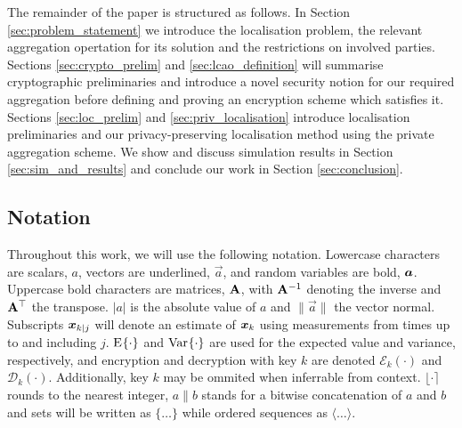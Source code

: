 \documentclass[10pt,journal,compsoc]{IEEEtran}
\theoremstyle{definition}
\theoremstyle{definition}
\theoremstyle{remark}
\begin{document}
The remainder of the paper is structured as follows. In Section \ref{sec:problem_statement} we introduce the localisation problem, the relevant aggregation opertation for its solution and the restrictions on involved parties. Sections \ref{sec:crypto_prelim} and \ref{sec:lcao_definition} will summarise cryptographic preliminaries and introduce a novel security notion for our required aggregation before defining and proving an encryption scheme which satisfies it. Sections \ref{sec:loc_prelim} and \ref{sec:priv_localisation} introduce localisation preliminaries and our privacy-preserving localisation method using the private aggregation scheme. We show and discuss simulation results in Section \ref{sec:sim_and_results} and conclude our work in Section \ref{sec:conclusion}.

% 
% 

\subsection{Notation}
Throughout this work, we will use the following notation. Lowercase characters are scalars, $a$, vectors are underlined, $\vec{a}$, and random variables are bold, ${\boldsymbol{a}}$. Uppercase bold characters are matrices, ${{\mathbf{A}}}$, with ${{\mathbf{A}}}^{-1}$ denoting the inverse and ${{\mathbf{A}}}^\top$ the transpose. $|a|$ is the absolute value of $a$ and $\lVert\vec{a}\rVert$ the vector normal. Subscripts ${\boldsymbol{x}}_{k|j}$ will denote an estimate of ${\boldsymbol{x}}_k$ using measurements from times up to and including $j$. $\E{\cdot}$ and $\Var{\cdot}$ are used for the expected value and variance, respectively, and encryption and decryption with key $k$ are denoted $\mathcal{E}_{k}(\cdot)$ and $\mathcal{D}_{k}(\cdot)$. Additionally, key $k$ may be ommited when inferrable from context. $\lfloor\cdot\rceil$ rounds to the nearest integer, $a\|b$ stands for a bitwise concatenation of $a$ and $b$ and sets will be written as $\{\dots\}$ while ordered sequences as $\langle\dots\rangle$.

% 
%                              
%                              
%                              
% 
\end{document}
